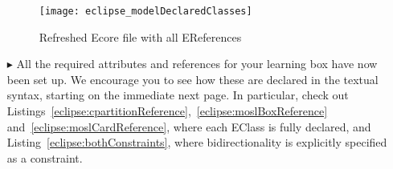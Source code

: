 \begin{itemize}
\vspace{1cm}

\begin{figure}[htbp]
	\centering
  \texttt{[image: eclipse\_modelDeclaredClasses]}
	\caption{Refreshed Ecore file with all EReferences}
	\label{eclipse:model_allClasses}
\end{figure}

\vspace{1cm}

\item[$\blacktriangleright$] All the required attributes and references for your learning box have now been set up. We encourage you to see how these are
declared in the textual syntax, starting on the immediate next page. In particular, check out Listings~\ref{eclipse:cpartitionReference},~\ref{eclipse:moslBoxReference} and~\ref{eclipse:moslCardReference}, where each EClass is fully
declared, and Listing~\ref{eclipse:bothConstraints}, where bidirectionality is explicitly specified as a constraint.


\end{itemize}
